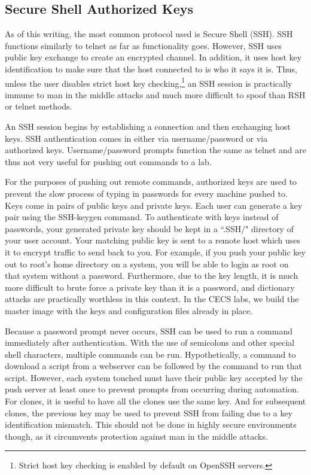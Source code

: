 \subsection{Secure Shell Authorized Keys}
As of this writing, the most common protocol used is Secure Shell (SSH).  SSH functions similarly to telnet as far as functionality goes.  However, SSH uses public key exchange to create an encrypted channel.  In addition, it uses host key identification to make sure that the host connected to is who it says it is.  Thus, unless the user disables strict host key checking,\footnote{Strict host key checking is enabled by default on OpenSSH servers.} an SSH session is practically immune to man in the middle attacks and much more difficult to spoof than RSH or telnet methods.   

An SSH session begins by establishing a connection and then exchanging host keys.  SSH authentication comes in either via username/password or via authorized keys.  Username/password prompts function the same as telnet and are thus not very useful for pushing out commands to a lab.

For the purposes of pushing out remote commands, authorized keys are used to prevent the slow process of typing in passwords for every machine pushed to.  Keys come in pairs of public keys and private keys.  Each user can generate a key pair using the SSH-keygen command.  To authenticate with keys instead of passwords, your generated private key should be kept in a ``.SSH/" directory of your user account.  Your matching public key is sent to a remote host which uses it to encrypt traffic to send back to you.  For example, if you push your public key out to root's home directory on a system, you will be able to login as root on that system without a password.  Furthermore, due to the key length, it is much more difficult to brute force a private key than it is a password, and dictionary attacks are practically worthless in this context.  In the CECS labs, we build the master image with the keys and configuration files already in place.  

Because a password prompt never occurs, SSH can be used to run a command immediately after authentication.  With the use of semicolons and other special shell characters, multiple commands can be run.  Hypothetically, a command to download a script from a webserver can be followed by the command to run that script.  However, each system touched must have their public key accepted by the push server at least once to prevent prompts from occurring during automation.  For clones, it is useful to have all the clones use the same key.  And for subsequent clones, the previous key may be used to prevent SSH from failing due to a key identification mismatch.  This should not be done in highly secure environments though, as it circumvents protection against man in the middle attacks.  

